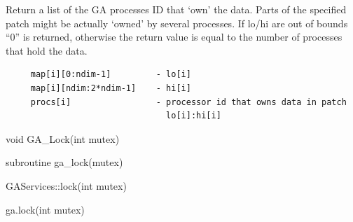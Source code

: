\documentclass[12pt]{article}
\begin{document}
\local

\begin{desc}

Return a list of the GA processes ID that `own' the data. Parts of the
specified patch might be actually `owned' by several processes. If lo/hi are
out of bounds ``0'' is returned, otherwise the return value is equal to the
number of processes that hold the data.

\begin{verbatim}
     map[i][0:ndim-1]         - lo[i]
     map[i][ndim:2*ndim-1]    - hi[i]
     procs[i]                 - processor id that owns data in patch
                                lo[i]:hi[i]
\end{verbatim}

\end{desc}



\begin{capi}
\begin{ccode}
void GA_Lock(int mutex)
\end{ccode}
\begin{funcargs}
\end{funcargs}
\end{capi}

\begin{fapi}
\begin{fcode}
subroutine ga_lock(mutex)
\end{fcode}
\begin{funcargs}
\end{funcargs}
\end{fapi}

\begin{cxxapi}
\begin{cxxcode}
GAServices::lock(int mutex)
\end{cxxcode}
\begin{funcargs}
\end{funcargs}
\end{cxxapi}

\begin{pyapi}
\begin{pycode}
ga.lock(int mutex)
\end{pycode}
\end{pyapi}

\ncoll
\end{document}
